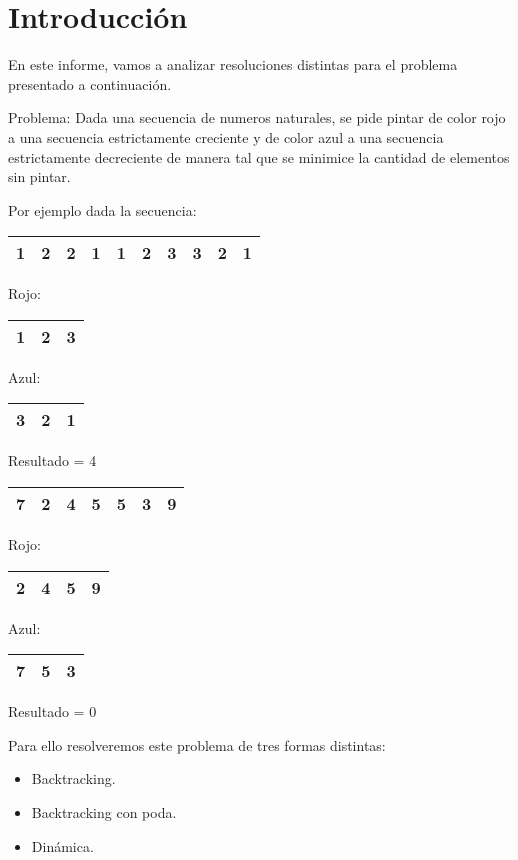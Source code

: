 \section{Introducción}

En este informe, vamos a analizar resoluciones distintas para el problema presentado a continuación.

Problema: Dada una secuencia de numeros naturales, se pide  pintar de color rojo a una secuencia estrictamente creciente y de color azul a una secuencia estrictamente decreciente
de manera tal que se minimice la cantidad de elementos sin pintar.

Por ejemplo dada la secuencia:
\begin{flushleft}
\newline
  \begin{tabular}{ | l | c | r | l | c | r | l | c | r | l |}
    \hline
1 & 2 & 2 & 1 & 1 & 2 & 3 & 3 & 2 & 1\\ \hline
  \end{tabular}
\newline
Rojo:
\newline
  \begin{tabular}{ | l | c | r |}
    \hline
    1 & 2 & 3 \\ \hline
  \end{tabular}
 \newline
  Azul:
  \newline
  \begin{tabular}{ | l | c | r |}
    \hline
    3 & 2 & 1 \\ \hline
  \end{tabular}
  \newline
Resultado = 4
\vspace*{5mm}
\newline
  \begin{tabular}{ | l | c | r | l | c | r | l |}
    \hline
7 & 2 & 4 & 5 & 5 & 3 & 9\\ \hline
  \end{tabular}
\newline
Rojo:
\newline
  \begin{tabular}{ | l | c | r | r |}
    \hline
    2 & 4 & 5 & 9\\ \hline
  \end{tabular}
 \newline
  Azul:
  \newline
  \begin{tabular}{ | l | c | r |}
    \hline
    7 & 5 & 3 \\ \hline
  \end{tabular}
  \newline
Resultado = 0

\vspace*{5mm}

Para ello resolveremos este problema de tres formas distintas:

\vspace*{5mm}
\begin{itemize}
    \item Backtracking.
    \item Backtracking con poda.
    \item Dinámica.
\end{itemize}

\end{flushleft}
